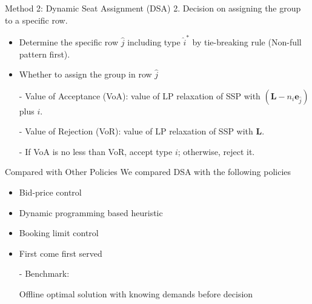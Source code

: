     \begin{frame}{Method 2: Dynamic Seat Assignment (DSA)}
      2. Decision on assigning the group to a specific row.
      \vspace{0.2cm}

      \begin{itemize}
        \item Determine the specific row $\hat{j}$ including type $\hat{i}^{*}$ by tie-breaking rule (Non-full pattern first). 
        \item Whether to assign the group in row $\hat{j}$
        \item[-] Value of Acceptance (VoA): value of LP relaxation of SSP with $(\mathbf{L}-n_{i} \mathbf{e}_{\hat{j}})$ plus $i$.
        

        \item[-] Value of Rejection (VoR): value of LP relaxation of SSP with $\mathbf{L}$.

        \item[-] If VoA is no less than VoR, accept type $i$; otherwise, reject it.
      \end{itemize}
    \end{frame}


    \begin{frame}{Compared with Other Policies}
      We compared DSA with the following policies 
      
      \vspace{0.5cm}
      
      \begin{itemize}
        \item Bid-price control
        \item Dynamic programming based heuristic
        \item Booking limit control
        \item First come first served
        \vspace{0.1cm}
        \item[-] Benchmark: 
        
        Offline optimal solution with knowing demands before decision
      \end{itemize}
    \end{frame}

